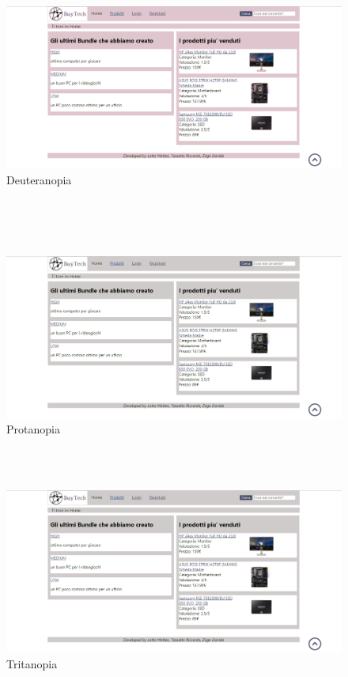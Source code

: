 \begin{figure}[h]
	\label{deuteranopia}
	\centering %
	\includegraphics[width=1\textwidth]{immagini/homedeute.png}
	\caption{Deuteranopia} %
\end{figure}\mbox{} \\

\mbox{} \\ \mbox{} \\ \Spazio
\newline
\begin{figure}[h]
	\label{protanopia}
	\centering %
	\includegraphics[width=1\textwidth]{immagini/homeprota.png}
	\caption{Protanopia} %
\end{figure}

\mbox{} \\ \mbox{} \\ \Spazio
\newline
\begin{figure}[h]
	\label{tritanopia}
	\centering %
	\includegraphics[width=1\textwidth]{immagini/hometrita.png}
	\caption{Tritanopia} %
\end{figure}
\newline
